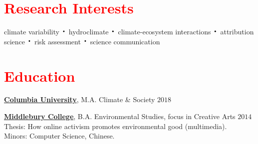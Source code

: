 \documentclass[margin,line,palatino,courier,10pt]{res}
\newcommand*{\bigDot}{\raisebox{-0.25ex}{\scalebox{2.1}{$\cdot$}}}
\newcommand{\CU}{http://climatesociety.ei.columbia.edu/}
\newcommand{\Midd}{http://www.middlebury.edu/academics/es}
\begin{document}


\begin{resume}


\section{\sc \textcolor{Red}{\large{Research Interests}}}
climate variability $\bigDot$  hydroclimate $\bigDot$  climate-ecosystem interactions $\bigDot$ attribution science $\bigDot$ risk assessment $\bigDot$ science communication  


\vspace{0.15in}
\section{\sc \textcolor{Red}{\large{Education}}}

{\bf \href{\CU}{Columbia University}}, M.A. Climate \& Society \hfill {$2018$}
\\
    \vspace*{-.15in} %
  
{\bf \href{\Midd}{Middlebury College}}, B.A. Environmental Studies, focus in Creative Arts 
\hfill {$2014$}
\\
    Thesis: How online activism promotes environmental good (multimedia).   \\ 
    Minors: Computer Science, Chinese. 
 


\end{resume}
\end{document}
